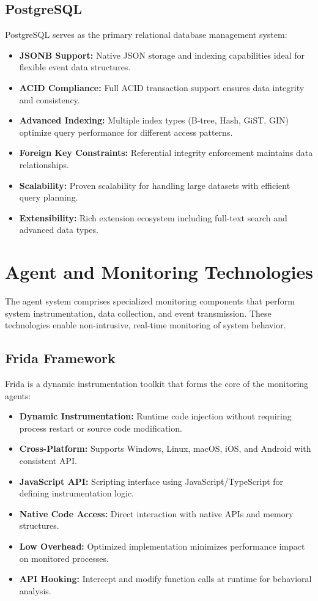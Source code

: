 \subsection{PostgreSQL}

PostgreSQL serves as the primary relational database management system:

\begin{itemize}
    \item \textbf{JSONB Support:} Native JSON storage and indexing capabilities ideal for flexible event data structures.
    \item \textbf{ACID Compliance:} Full ACID transaction support ensures data integrity and consistency.
    \item \textbf{Advanced Indexing:} Multiple index types (B-tree, Hash, GiST, GIN) optimize query performance for different access patterns.
    \item \textbf{Foreign Key Constraints:} Referential integrity enforcement maintains data relationships.
    \item \textbf{Scalability:} Proven scalability for handling large datasets with efficient query planning.
    \item \textbf{Extensibility:} Rich extension ecosystem including full-text search and advanced data types.
\end{itemize}

\section{Agent and Monitoring Technologies}

The agent system comprises specialized monitoring components that perform system instrumentation, data collection, and event transmission. These technologies enable non-intrusive, real-time monitoring of system behavior.

\subsection{Frida Framework}

Frida is a dynamic instrumentation toolkit that forms the core of the monitoring agents:

\begin{itemize}
    \item \textbf{Dynamic Instrumentation:} Runtime code injection without requiring process restart or source code modification.
    \item \textbf{Cross-Platform:} Supports Windows, Linux, macOS, iOS, and Android with consistent API.
    \item \textbf{JavaScript API:} Scripting interface using JavaScript/TypeScript for defining instrumentation logic.
    \item \textbf{Native Code Access:} Direct interaction with native APIs and memory structures.
    \item \textbf{Low Overhead:} Optimized implementation minimizes performance impact on monitored processes.
    \item \textbf{API Hooking:} Intercept and modify function calls at runtime for behavioral analysis.
\end{itemize}

